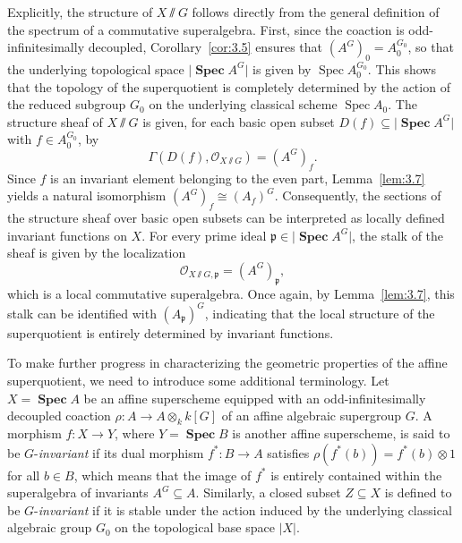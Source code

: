 \documentclass[11pt,a4paper,reqno,noamsfonts]{amsart}
\numberwithin{equation}{section}
\theoremstyle{definition}
\theoremstyle{remark}
\newcommand{\Ocal}{\ensuremath{\mathscr{O}}}
\newcommand{\pfrak}{\ensuremath{\mathfrak{p}}}
\DeclareMathOperator{\Spec}{Spec}
\DeclareMathOperator{\sSpec}{\mathbf{Spec}}
\begin{document}
Explicitly, the structure of $X {\sslash} G$ follows directly from the general definition of the spectrum of a commutative superalgebra. First, since the coaction is odd-infinitesimally decoupled, Corollary~\ref{cor:3.5} ensures that $(A^{G})_0 = A_0^{G_0}$, so that the underlying topological space $\lvert \sSpec A^{G} \rvert$ is given by $\Spec A_0^{G_0}$. This shows that the topology of the superquotient is completely determined by the action of the reduced subgroup $G_{0}$ on the underlying classical scheme $\Spec A_0$. The structure sheaf of $X {\sslash} G$ is given, for each basic open subset $D(f) \subseteq \lvert \sSpec A^{G} \rvert$ with $f \in A_0^{G_0}$, by
\begin{equation}
\Gamma(D(f), \Ocal_{X {\sslash} G}) = (A^{G})_f.
\end{equation}
Since $f$ is an invariant element belonging to the even part, Lemma~\ref{lem:3.7} yields a natural isomorphism $(A^{G})_f \cong (A_{f})^{G}$. Consequently, the sections of the structure sheaf over basic open subsets can be interpreted as locally defined invariant functions on $X$. For every prime ideal $\pfrak \in \lvert \sSpec A^{G} \rvert$, the stalk of the sheaf is given by the localization
\begin{equation}
\Ocal_{X {\sslash} G, \pfrak} = (A^{G})_{\pfrak},
\end{equation}
which is a local commutative superalgebra. Once again, by Lemma~\ref{lem:3.7}, this stalk can be identified with $(A_{\pfrak})^{G}$, indicating that the local structure of the superquotient is entirely determined by invariant functions.

To make further progress in characterizing the geometric properties of the affine superquotient, we need to introduce some additional terminology. Let $X = \sSpec A$ be an affine superscheme equipped with an odd-infinitesimally decoupled coaction $\rho \colon A \to A \otimes_k k[G]$ of an affine algebraic supergroup $G$. A morphism $f \colon X \to Y$, where $Y = \sSpec B$ is another affine superscheme, is said to be $G$-\emph{invariant} if its dual morphism $f^* \colon B \to A$ satisfies $\rho(f^*(b)) = f^*(b) \otimes 1$ for all $b \in B$, which means that the image of $f^{*}$ is entirely contained within the superalgebra of invariants $A^G \subseteq A$. Similarly, a closed subset $Z \subseteq  X $ is defined to be $G$-\emph{invariant} if it is stable under the action induced by the underlying classical algebraic group $G_{0}$ on the topological base space $\lvert X \rvert$.
\end{document}
